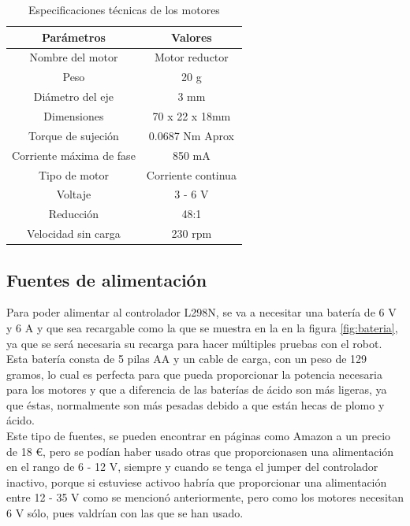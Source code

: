 \begin{table}[H]
\begin{center}
\begin{tabular}{|c|c|}
\hline
\textbf{Parámetros} & \textbf{Valores} \\
\hline

Nombre del motor & Motor reductor \\
Peso & 20 g \\  
Diámetro del eje & 3 mm \\   
Dimensiones & 70 x 22 x 18mm \\   
Torque de sujeción & 0.0687 Nm Aprox \\
Corriente máxima de fase & 850 mA \\  
Tipo de motor & Corriente continua \\   
Voltaje & 3 - 6 V \\  
Reducción & 48:1 \\ 
Velocidad sin carga & 230 rpm \\ 


\hline
\end{tabular}
\caption{Especificaciones técnicas de los motores}
\label{cuadro:ejemplo}
\end{center}
\end{table}


\subsection{Fuentes de alimentación}
\label{subsec:fuentes_alimentacion}

Para poder alimentar al controlador L298N, se va a necesitar una batería de 6 V y 6 A y que sea recargable como la que se muestra en la 
en la figura \ref{fig:bateria}, ya que se será necesaria su recarga para hacer múltiples pruebas con el robot. Esta batería consta de 5 pilas AA y un cable de carga, con un peso de 129 gramos, lo cual es perfecta para que pueda proporcionar la potencia necesaria para los motores y que a diferencia de las baterías de ácido son más ligeras, ya que éstas, normalmente son más pesadas debido a que están hecas de plomo y ácido.\\

Este tipo de fuentes, se pueden encontrar en páginas como Amazon a un precio de 18 \euro, pero se podían haber usado otras que proporcionasen una alimentación en el rango de 6 - 12 V, siempre y cuando se tenga el jumper del controlador inactivo, porque si estuviese activoo habría que proporcionar una alimentación entre 12 - 35 V como se mencionó anteriormente, pero como los motores necesitan 6 V sólo, pues valdrían con las que se han usado. \\

